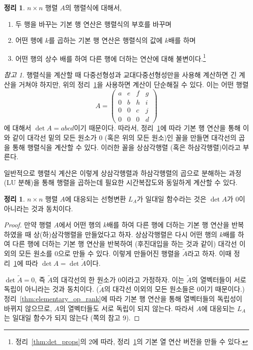 \documentclass[unfonts,oneside,a4paper]{oblivoir}
\theoremstyle{definition}
\theoremstyle{theorem}
\newtheorem{theorem}[definition]{정리}
\theoremstyle{theorem}
\theoremstyle{remark}
\newtheorem*{remark}{참고}
\theoremstyle{remark}
\theoremstyle{remark}
\theoremstyle{remark}
\begin{document}
\begin{theorem} \label{thm:ero_det}
    $n \times n$ 행렬 $A$의 행렬식에 대해서,
    \begin{enumerate}
        \item 두 행을 바꾸는 기본 행 연산은 행렬식의 부호를 바꾸며
        \item 어떤 행에 $k$를 곱하는 기본 행 연산은 행렬식의 값에 $k$배를 하며
        \item 어떤 행의 상수 배를 하여 다른 행에 더하는 연산에 대해 불변이다.\footnote{정리~\ref{thm:det_props}의 2에 따라, 정리~\ref{thm:ero_det}의 기본 열 연산 버전을 만들 수 있다.}
    \end{enumerate}
\end{theorem}

\begin{remark}
    행렬식을 계산할 때 다중선형성과 교대다중선형성만을 사용해 계산하면 긴 계산을 거쳐야 하지만, 위의 정리~\ref{thm:ero_det}을 사용하면 계산이 단순해질 수 있다.
    이는 어떤 행렬
    \begin{equation*}
        A =\begin{pmatrix}a&e&f&g\\0&b&h&i\\0&0&c&j\\0&0&0&d\end{pmatrix}
    \end{equation*}
    에 대해서 $\det A = abcd$이기 때문이다.
    따라서, 정리~\ref{thm:ero_det}에 따라 기본 행 연산을 통해 이와 같이 대각선 밑의 모든 원소가 0 (혹은 위의 모든 원소)인 꼴을 만들면 대각선의 곱을 통해 행렬식을 계산할 수 있다.
    이러한 꼴을 상삼각행렬 (혹은 하삼각행렬)이라고 부른다.

    일반적으로 행렬식 계산은 이렇게 상삼각행렬과 하삼각행렬의 곱으로 분해하는 과정(LU 분해)을 통해 행렬을 곱하는데 필요한 시간복잡도와 동일하게 계산할 수 있다.
\end{remark}

\begin{theorem} \label{thm:nonzero_det}
    $n \times n$ 행렬 $A$에 대응되는 선형변환 $L_A$가 일대일 함수라는 것은 $\det A$가 0이 아니라는 것과 동치이다.
\end{theorem}
\begin{proof}
    만약 행렬 $A$에서 어떤 행의 $k$배를 하여 다른 행에 더하는 기본 행 연산을 반복하였을 때 상(하)삼각행렬을 만들었다고 하자.
    상삼각행렬은 다시 어떤 행의 $k$배를 하여 다른 행에 더하는 기본 행 연산을 반복하여 (후진대입을 하는 것과 같이) 대각선 이외의 모든 원소를 0으로 만들 수 있다.
    이렇게 만들어진 행렬을 $\tilde A$라고 하자.
    이때 정리~\ref{thm:ero_det}에 따라 $\det A = \det \tilde A$이다.

    $\det \tilde A = 0$, 즉 $\tilde A$의 대각선의 한 원소가 0이라고 가정하자.
    이는 $\tilde A$의 열벡터들이 서로 독립이 아니라는 것과 동치이다. ($\tilde A$의 대각선 이외의 모든 원소들은 0이기 때문이다.)
    정리~\ref{thm:elementary_op_rank}에 따라 기본 행 연산을 통해 열벡터들의 독립성이 바뀌지 않으므로, $A$의 열벡터들도 서로 독립이 되지 않는다.
    따라서 $A$에 대응되는 $L_A$는 일대일 함수가 되지 않는다 (\pageref{page:equiv_remark}쪽의 참고 9).
\end{proof}
\end{document}
